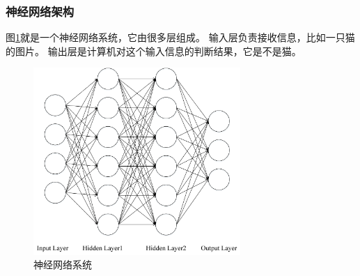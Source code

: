 \subsubsection{神经网络架构}
图\ref{fig:2.5.1}就是一个神经网络系统，它由很多层组成。
输入层负责接收信息，比如一只猫的图片。
输出层是计算机对这个输入信息的判断结果，它是不是猫。
\begin{figure}
  \centering
  \includegraphics[width=0.7\textwidth]{./img/ch2/mao.png}
  \caption{神经网络系统}
  \label{fig:2.5.1}
\end{figure}
